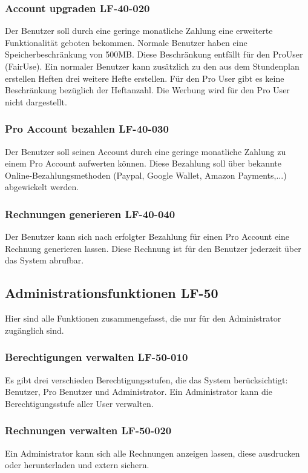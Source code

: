 \documentclass[12pt,a4paper,oneside,ngerman]{scrartcl}
\begin{document}
\subsubsection{Account upgraden \hfill LF-40-020}
Der Benutzer soll durch eine geringe monatliche Zahlung eine erweiterte Funktionalität geboten bekommen. Normale Benutzer haben eine Speicherbeschränkung von 500MB. Diese Beschränkung entfällt für den \gls{ProUser} (\gls{FairUse}). Ein normaler Benutzer kann zusätzlich zu den aus dem Stundenplan erstellen Heften drei weitere Hefte erstellen. Für den Pro User gibt es keine Beschränkung bezüglich der Heftanzahl. Die Werbung wird für den Pro User nicht dargestellt.

\subsubsection{Pro Account bezahlen \hfill LF-40-030}
Der Benutzer soll seinen Account durch eine geringe monatliche Zahlung zu einem Pro Account aufwerten können. Diese Bezahlung soll über bekannte Online-Bezahlungsmethoden (Paypal, Google Wallet, Amazon Payments,...) abgewickelt werden.

\subsubsection{Rechnungen generieren \hfill LF-40-040}
Der Benutzer kann sich nach erfolgter Bezahlung für einen Pro Account eine Rechnung generieren lassen. Diese Rechnung ist für den Benutzer jederzeit über das System abrufbar.

\subsection[Administrationsfunktionen]{Administrationsfunktionen \hfill LF-50}
Hier sind alle Funktionen zusammengefasst, die nur für den Administrator zugänglich sind.

\subsubsection{Berechtigungen verwalten \hfill LF-50-010}
Es gibt drei verschieden Berechtigungsstufen, die das System berücksichtigt: Benutzer, Pro Benutzer und Administrator. Ein Administrator kann die Berechtigungsstufe aller User verwalten.

\subsubsection{Rechnungen verwalten \hfill LF-50-020}
Ein Administrator kann sich alle Rechnungen anzeigen lassen, diese ausdrucken oder herunterladen und extern sichern.
\end{document}
